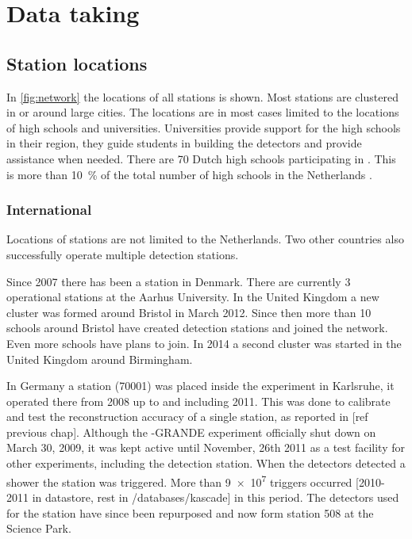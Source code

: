 \section{Data taking}


\subsection{Station locations}

In \cref{fig:network} the locations of all \hisparc stations is shown. Most stations are clustered in or around large cities. The locations are in most cases limited to the locations of high schools and universities. Universities provide support for the high schools in their region, they guide students in building the detectors and provide assistance when needed. There are \num{70} Dutch high schools participating in \hisparc. This is more than \SI{10}{\percent} of the total number of high schools in the Netherlands \cite{duo2016hoofd}.


\subsubsection{International}

Locations of \hisparc stations are not limited to the Netherlands. Two other countries also successfully operate multiple detection stations.

Since 2007 there has been a \hisparc station in Denmark. There are currently 3 operational stations at the Aarhus University. In the United Kingdom a new cluster was formed around Bristol in March 2012. Since then more than 10 schools around Bristol have created detection stations and joined the network. Even more schools have plans to join. In 2014 a second cluster was started in the United Kingdom around Birmingham.

In Germany a station (70001) was placed inside the \kascade experiment in Karlsruhe, it operated there from 2008 up to and including 2011. This was done to calibrate and test the reconstruction accuracy of a single \hisparc station, as reported in [ref previous chap]. Although the \kascade-GRANDE experiment officially shut down on March 30, 2009, it was kept active until November, 26th 2011 as a test facility for other experiments, including the \hisparc detection station. When the \kascade detectors detected a shower the \hisparc station was triggered. More than \num{9e7} triggers occurred [2010-2011 in datastore, rest in /databases/kascade] in this period. The detectors used for the \kascade station have since been repurposed and now form station 508 at the Science Park.

